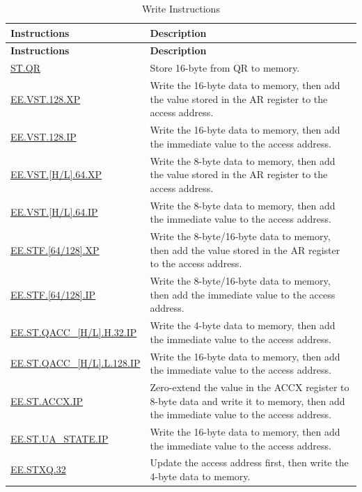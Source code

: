 \begin{longtable}[c]{|l|m{11cm}|}
    \caption{Write Instructions}
    \label{tab:pie-store-instructions}\\
    \hline
    \rowcolor{lightgray}
        \textbf{Instructions} & \textbf{Description} \\\hline
    \endfirsthead
    \rowcolor{lightgray}
    \textbf{Instructions} & \textbf{Description} \\\hline
    \endhead
    \endfoot
    
    \hyperref[instruction:STQR]{ST.QR} & Store 16-byte from QR to memory.
    \\\hline
    \hyperref[instruction:EEVST128XP]{EE.VST.128.XP} & Write the 16-byte data to memory, then add the value stored in the AR register to the access address.
    \\\hline
    \hyperref[instruction:EEVST128IP]{EE.VST.128.IP} & Write the 16-byte data to memory, then add the immediate value to the access address.
    \\\hline
    \hyperref[instruction:EEVSTH64XP]{EE.VST.[H/L].64.XP} & Write the 8-byte data to memory, then add the value stored in the AR register to the access address.
    \\\hline
    \hyperref[instruction:EEVSTH64IP]{EE.VST.[H/L].64.IP} & Write the 8-byte data to memory, then add the immediate value to the access address.
    \\\hline
    \hyperref[instruction:EESTF64XP]{EE.STF.[64/128].XP} & Write the 8-byte/16-byte data to memory, then add the value stored in the AR register to the access address.
    \\\hline
    \hyperref[instruction:EESTF64IP]{EE.STF.[64/128].IP} & Write the 8-byte/16-byte data to memory, then add the immediate value to the access address.
    \\\hline 
    \hyperref[instruction:EESTQACCHH32IP]{EE.ST.QACC\_[H/L].H.32.IP} & Write the 4-byte data to memory, then add the immediate value to the access address.
    \\\hline
    \hyperref[instruction:EESTQACCHL128IP]{EE.ST.QACC\_[H/L].L.128.IP} & Write the 16-byte data to memory, then add the immediate value to the access address.
    \\\hline
    \hyperref[instruction:EESTACCXIP]{EE.ST.ACCX.IP} & Zero-extend the value in the ACCX register to 8-byte data and write it to memory, then add the immediate value to the access address.
    \\\hline
    \hyperref[instruction:EESTUASTATEIP]{EE.ST.UA\_STATE.IP} & Write the 16-byte data to memory, then add the immediate value to the access address.
    \\\hline
    \hyperref[instruction:EESTXQ32]{EE.STXQ.32} & Update the access address first, then write the 4-byte data to memory.
    \\\hline
\end{longtable}